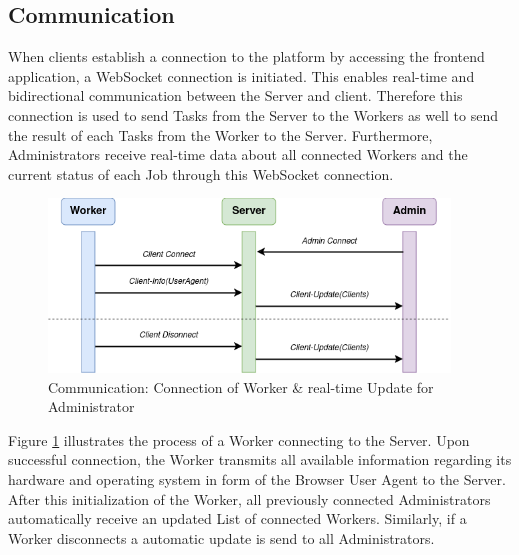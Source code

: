 \subsection{Communication}
\label{subsec:implementation:architecture:communication}
When clients establish a connection to the platform by accessing the frontend application, a WebSocket connection is initiated. This enables real-time and bidirectional communication between the Server and client. Therefore this connection is used to send Tasks from the Server to the Workers as well to send the result of each Tasks from the Worker to the Server. Furthermore, Administrators receive real-time data about all connected Workers and the current status of each Job through this WebSocket connection.

\begin{figure}[htbp]
    \centering
    \includegraphics[width=0.95\textwidth]{gfx/figures/communication-connection.png}
    \caption{Communication: Connection of Worker \& real-time Update for Administrator}
    \label{fig:implementation:communication1}
\end{figure}

Figure \ref{fig:implementation:communication1} illustrates the process of a Worker connecting to the Server. Upon successful connection, the Worker transmits all available information regarding its hardware and operating system in form of the Browser User Agent to the Server. After this initialization of the Worker, all previously connected Administrators automatically receive an updated List of connected Workers. Similarly, if a Worker disconnects a automatic update is send to all Administrators.

